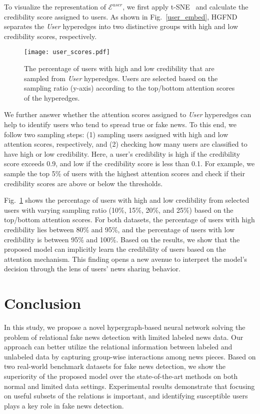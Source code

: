 \documentclass[conference]{IEEEtran}
\begin{document}
To visualize the representation of $\mathcal{E}^{user}$, we first apply t-SNE~\cite{pedregosa2011scikit} and calculate the credibility score assigned to users. As shown in Fig.~\ref{user_embed}, HGFND separates the \textit{User} hyperedges into two distinctive groups with high and low credibility scores, respectively.



\begin{figure}[H]
\centering
\texttt{[image: user\_scores.pdf]}
\caption{The percentage of users with high and low credibility that are sampled from \textit{User} hyperedges. Users are selected based on the sampling ratio (y-axis) according to the top/bottom attention scores of the hyperedges.}
\label{user_detect}
\end{figure}

We further answer whether the attention scores assigned to \textit{User} hyperedges can help to identify users who tend to spread true or fake news. To this end, we follow two sampling steps: (1) sampling users assigned with  high and low attention scores, respectively, and (2) checking how many users are classified to have high or low credibility. Here, a user's credibility is high if the credibility score exceeds 0.9, and low if the credibility score is less than 0.1. For example, we sample the top 5\% of users with the highest attention scores and check if their credibility scores are above or below the thresholds. 

Fig.~\ref{user_detect} shows the percentage of users with high and low credibility from selected users with varying sampling ratio (10\%, 15\%, 20\%, and 25\%) based on the top/bottom attention scores. For both datasets, the percentage of users with high credibility lies between 80\% and 95\%, and the percentage of users with low credibility is between 95\% and 100\%. Based on the results, we show that the proposed model can implicitly learn the credibility of users based on the attention mechanism. This finding opens a new avenue to interpret the model's decision through the lens of users' news sharing behavior.





\section{Conclusion}
In this study, we propose a novel hypergraph-based neural network solving the problem of relational fake news detection with limited labeled news data. Our approach can better utilize the relational information between labeled and unlabeled data by capturing group-wise interactions among news pieces. Based on two real-world benchmark datasets for fake news detection, we show the superiority of the proposed model over the state-of-the-art methods on both normal and limited data settings. Experimental results demonstrate that focusing on useful subsets of the relations is important, and identifying susceptible users plays a key role in fake news detection.
\end{document}
